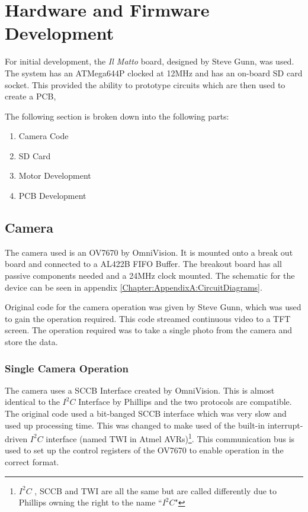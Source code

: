 \chapter{Hardware and Firmware Development} \label{Chapter:HardwareDevelopment}
For initial development, the \textit{Il Matto} board, designed by Steve Gunn, was used. The system has an ATMega644P clocked at 12MHz and has an on-board SD card socket. This provided the ability to prototype circuits which are then used to create a PCB, 

The following section is broken down into the following parts:
\begin{enumerate}
\item[\ref{Section:Camera}] Camera Code
\item[\ref{sect:SDCard}] SD Card
\item[\ref{Section:Motor_Dev}] Motor Development
\item[\ref{Section:PCB_Dev}] PCB Development
\end{enumerate}

\section{Camera} \label{Section:Camera}

The camera used is an OV7670 by OmniVision. It is mounted onto a break out board and connected to a AL422B FIFO Buffer. The breakout board has all passive components needed and a 24MHz clock mounted. The schematic for the device can be seen in appendix \ref{Chapter:AppendixA:CircuitDiagrams}.

Original code for the camera operation was given by Steve Gunn, which was used to gain the operation required. This code streamed continuous video to a TFT screen. The operation required was to take a single photo from the camera and store the data. 

\subsection{Single Camera Operation}

The camera uses a SCCB Interface \citep{SCCB_Interface} created by OmniVision. This is almost identical to the $I^{2}C$ Interface by Phillips and the two protocols are compatible. The original code used a bit-banged SCCB interface which was very slow and used up processing time. This was changed to make used of the built-in interrupt-driven $I^{2}C$ interface (named TWI in Atmel AVRs)\footnote{$I^{2}C$ , SCCB and TWI are all the same but are called differently due to Phillips owning the right to the name ``$I^{2}C$"}. This communication bus is used to set up the control registers of the OV7670 to enable operation in the correct format. 

